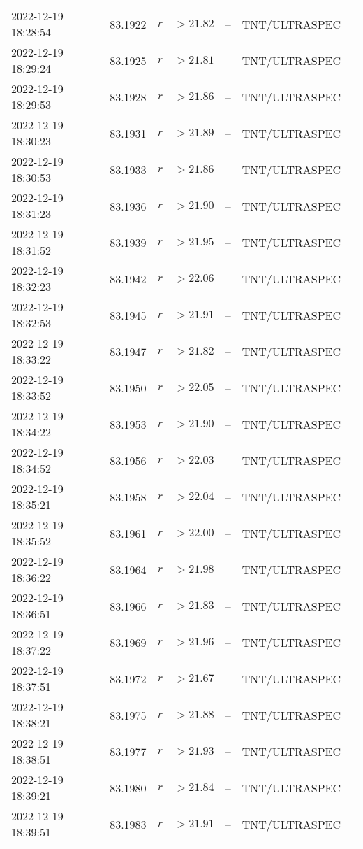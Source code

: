 \documentclass{nature_plusfigure}
\begin{document}
\begin{supplement}
\begin{center}
\begin{longtable}{lllllll}
2022-12-19 18:28:54 & 83.1922 & $r$ & $>21.82$ & -- & TNT/ULTRASPEC &  \\ 
2022-12-19 18:29:24 & 83.1925 & $r$ & $>21.81$ & -- & TNT/ULTRASPEC &  \\ 
2022-12-19 18:29:53 & 83.1928 & $r$ & $>21.86$ & -- & TNT/ULTRASPEC &  \\ 
2022-12-19 18:30:23 & 83.1931 & $r$ & $>21.89$ & -- & TNT/ULTRASPEC &  \\ 
2022-12-19 18:30:53 & 83.1933 & $r$ & $>21.86$ & -- & TNT/ULTRASPEC &  \\ 
2022-12-19 18:31:23 & 83.1936 & $r$ & $>21.90$ & -- & TNT/ULTRASPEC &  \\ 
2022-12-19 18:31:52 & 83.1939 & $r$ & $>21.95$ & -- & TNT/ULTRASPEC &  \\ 
2022-12-19 18:32:23 & 83.1942 & $r$ & $>22.06$ & -- & TNT/ULTRASPEC &  \\ 
2022-12-19 18:32:53 & 83.1945 & $r$ & $>21.91$ & -- & TNT/ULTRASPEC &  \\ 
2022-12-19 18:33:22 & 83.1947 & $r$ & $>21.82$ & -- & TNT/ULTRASPEC &  \\ 
2022-12-19 18:33:52 & 83.1950 & $r$ & $>22.05$ & -- & TNT/ULTRASPEC &  \\ 
2022-12-19 18:34:22 & 83.1953 & $r$ & $>21.90$ & -- & TNT/ULTRASPEC &  \\ 
2022-12-19 18:34:52 & 83.1956 & $r$ & $>22.03$ & -- & TNT/ULTRASPEC &  \\ 
2022-12-19 18:35:21 & 83.1958 & $r$ & $>22.04$ & -- & TNT/ULTRASPEC &  \\ 
2022-12-19 18:35:52 & 83.1961 & $r$ & $>22.00$ & -- & TNT/ULTRASPEC &  \\ 
2022-12-19 18:36:22 & 83.1964 & $r$ & $>21.98$ & -- & TNT/ULTRASPEC &  \\ 
2022-12-19 18:36:51 & 83.1966 & $r$ & $>21.83$ & -- & TNT/ULTRASPEC &  \\ 
2022-12-19 18:37:22 & 83.1969 & $r$ & $>21.96$ & -- & TNT/ULTRASPEC &  \\ 
2022-12-19 18:37:51 & 83.1972 & $r$ & $>21.67$ & -- & TNT/ULTRASPEC &  \\ 
2022-12-19 18:38:21 & 83.1975 & $r$ & $>21.88$ & -- & TNT/ULTRASPEC &  \\ 
2022-12-19 18:38:51 & 83.1977 & $r$ & $>21.93$ & -- & TNT/ULTRASPEC &  \\ 
2022-12-19 18:39:21 & 83.1980 & $r$ & $>21.84$ & -- & TNT/ULTRASPEC &  \\ 
2022-12-19 18:39:51 & 83.1983 & $r$ & $>21.91$ & -- & TNT/ULTRASPEC &  \\ 

\end{longtable}
\end{center}
\end{supplement}
\end{document}
